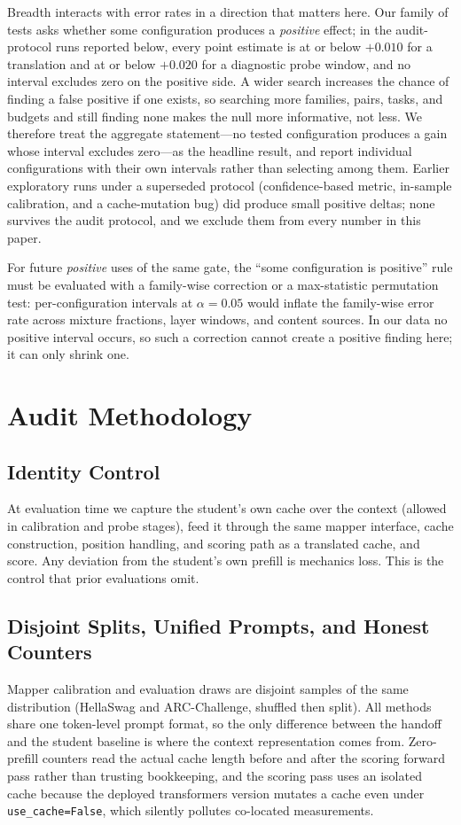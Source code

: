 \documentclass[10pt]{article}
\begin{document}
Breadth interacts with error rates in a direction that matters here. Our family
of tests asks whether some configuration produces a \emph{positive} effect; in
the audit-protocol runs reported below, every point estimate is at or below
$+0.010$ for a translation and at or below $+0.020$ for a diagnostic probe
window, and no interval excludes zero on the positive side. A wider search
increases the chance of finding a false positive if one exists, so searching
more families, pairs, tasks, and budgets and still finding none makes the null
more informative, not less. We therefore treat the aggregate statement---no
tested configuration produces a gain whose interval excludes zero---as the
headline result, and report individual configurations with their own intervals
rather than selecting among them. Earlier exploratory runs under a superseded
protocol (confidence-based metric, in-sample calibration, and a cache-mutation
bug) did produce small positive deltas; none survives the audit protocol, and
we exclude them from every number in this paper.

For future \emph{positive} uses of the same gate, the ``some configuration is
positive'' rule must be evaluated with a family-wise correction or a
max-statistic permutation test: per-configuration intervals at
$\alpha{=}0.05$ would inflate the family-wise error rate across mixture
fractions, layer windows, and content sources. In our data no positive interval
occurs, so such a correction cannot create a positive finding here; it can only
shrink one.

\section{Audit Methodology}
\label{sec:method}

\subsection{Identity Control}
At evaluation time we capture the student's own cache over the context
(allowed in calibration and probe stages), feed it through the same mapper
interface, cache construction, position handling, and scoring path as a
translated cache, and score. Any deviation from the student's own prefill is
mechanics loss. This is the control that prior evaluations omit.

\subsection{Disjoint Splits, Unified Prompts, and Honest Counters}
Mapper calibration and evaluation draws are disjoint samples of the same
distribution (HellaSwag and ARC-Challenge, shuffled then split). All methods
share one token-level prompt format, so the only difference between the
handoff and the student baseline is where the context representation comes
from. Zero-prefill counters read the actual cache length before and after the
scoring forward pass rather than trusting bookkeeping, and the scoring pass
uses an isolated cache because the deployed transformers version mutates a
cache even under \texttt{use\_cache=False}, which silently pollutes
co-located measurements.
\end{document}
